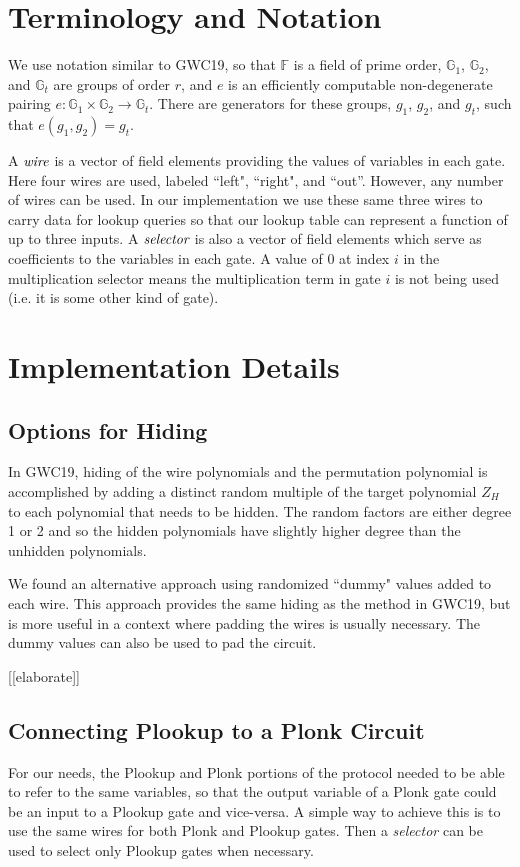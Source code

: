 \documentclass[fleqn]{article}
\begin{document}
	\section{Terminology and Notation}
		We use notation similar to GWC19, so that $\mathbb{F}$ is a field of prime order, $\mathbb{G}_1$, $\mathbb{G}_2$, and $\mathbb{G}_t$ are groups of order $r$, and $e$ is an efficiently computable non-degenerate pairing $e:\mathbb{G}_1\times\mathbb{G}_2\to\mathbb{G}_t$. There are generators for these groups, $g_1$, $g_2$, and $g_t$, such that $e(g_1, g_2) = g_t$.
	
		A $\emph{wire}$ is a vector of field elements providing the values of variables in each gate. Here four wires are used, labeled ``left", ``right", and ``out''. However, any number of wires can be used. In our implementation we use these same three wires to carry data for lookup queries so that our lookup table can represent a function of up to three inputs. A $\emph{selector}$ is also a vector of field elements which serve as coefficients to the variables in each gate. A value of $0$ at index $i$ in the multiplication selector means the multiplication term in gate $i$ is not being used (i.e. it is some other kind of gate).
		
	\section{Implementation Details}
		\subsection{Options for Hiding} %
		In GWC19, hiding of the wire polynomials and the permutation polynomial is accomplished by adding a distinct random multiple of the target polynomial $Z_H$ to each polynomial that needs to be hidden. The random factors are either degree 1 or 2 and so the hidden polynomials have slightly higher degree than the unhidden polynomials.
		
		We found an alternative approach using randomized ``dummy" values added to each wire. This approach provides the same hiding as the method in GWC19, but is more useful in a context where padding the wires is usually necessary. The dummy values can also be used to pad the circuit.
		
		[[elaborate]]
		
		\subsection{Connecting Plookup to a Plonk Circuit} %
		For our needs, the Plookup and Plonk portions of the protocol needed to be able to refer to the same variables, so that the output variable of a Plonk gate could be an input to a Plookup gate and vice-versa. A simple way to achieve this is to use the same wires for both Plonk and Plookup gates. Then a \emph{selector} can be used to select only Plookup gates when necessary.
		
\end{document}
